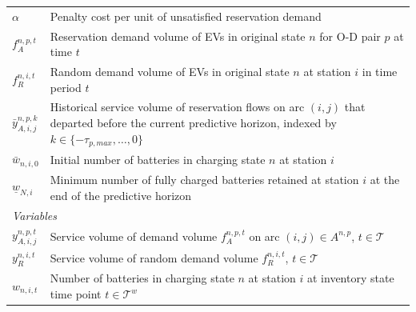 \documentclass[12pt,hyperref,a4paper,UTF8]{ctexart}
\begin{document}
\begin{table}[!htbp]
\begin{tabular}{@{}lp{13cm}@{}}
    $\alpha$ & Penalty cost per unit of unsatisfied reservation demand\\
    $f_A^{n,p,t}$ & Reservation demand volume of EVs in original state $n$ for O-D pair $p$ at time $t$ \\
    $f_{R}^{n,i,t}$ & Random demand volume of EVs in original state $n$ at station $i$ in time period $t$ \\
    $\bar{y}_{A,i,j}^{n,p,k}$ & Historical service volume of reservation flows on arc $(i,j)$ that departed before the current predictive horizon, indexed by $k\in\{-\tau_{p,max},\dots,0\}$ \\
    $\bar{w}_{n,i,0}$ & Initial number of batteries in charging state $n$ at station $i$ \\
    $\underline{w}_{N,i}$ & Minimum number of fully charged batteries retained at station $i$ at the end of the predictive horizon \\
    \midrule
    \multicolumn{2}{l}{\textit{Variables}} \\
    $y_{A,i,j}^{n,p,t}$ & Service volume of demand volume $f_{A}^{n,p,t}$ on arc $(i,j) \in A^{n,p}$, $t\in\mathcal{T}$ \\
    $y_{R}^{n,i,t}$ & Service volume of random demand volume $f_{R}^{n,i,t}$, $t\in\mathcal{T}$\\
    $w_{n,i,t}$ & Number of batteries in charging state $n$ at station $i$ at inventory state time point $t\in\mathcal{T}^{w}$ \\
    \bottomrule
  \end{tabular}
\end{table}
\end{document}
